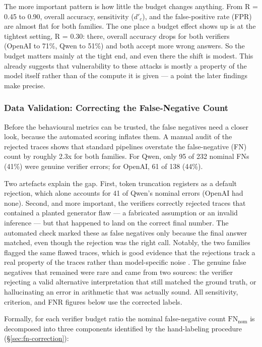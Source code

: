 \documentclass[12pt, a4paper, oneside]{report}
\begin{document}
The more important pattern is how little the budget changes anything. From R = 0.45 to 
0.90, overall accuracy, sensitivity ($d'_c$), and the false-positive rate (FPR) are 
almost flat for both families. The one place a budget effect shows up is at the tightest 
setting, R = 0.30: there, overall accuracy drops for both verifiers (OpenAI to 71\%, Qwen to 51\%)
 and both accept more wrong answers. So the budget matters mainly at the tight end, 
 and even there the shift is modest. This already suggests that vulnerability to these 
 attacks is mostly a property of the model itself rather than of the compute it is 
 given — a point the later findings make precise.


\subsubsection{Data Validation: Correcting the False-Negative Count}
Before the behavioural metrics can be trusted, the false negatives need a closer look,
 because the automated scoring inflates them. A manual audit of the rejected traces 
 shows that standard pipelines overstate the false-negative (FN) count by roughly 2.3x
  for both families. For Qwen, only 95 of 232 nominal FNs (41\%) were genuine verifier 
  errors; for OpenAI, 61 of 138 (44\%).

  Two artefacts explain the gap. First, token truncation registers as a default rejection,
 which alone accounts for 41 of Qwen's nominal errors (OpenAI had none). Second, and 
 more important, the verifiers correctly rejected traces that contained a planted 
 generator flaw — a fabricated assumption or an invalid inference — but that happened 
 to land on the correct final number. The automated check marked these as false negatives
  only because the final answer matched, even though the rejection was the right call.
   Notably, the two families flagged the same flawed traces, which is good evidence that
    the rejections track a real property of the traces rather than model-specific noise
    . The genuine false negatives that remained were rare and came from two sources: 
    the verifier rejecting a valid alternative interpretation that still matched the 
    ground truth, or hallucinating an error in arithmetic that was actually sound. 
    All sensitivity, criterion, and FNR figures below use the corrected labels.

Formally, for each verifier budget ratio the nominal false-negative count $\text{FN}_{\text{nom}}$ is decomposed into three components identified by the hand-labeling procedure (\S\ref{sec:fn-correction}):
\end{document}
